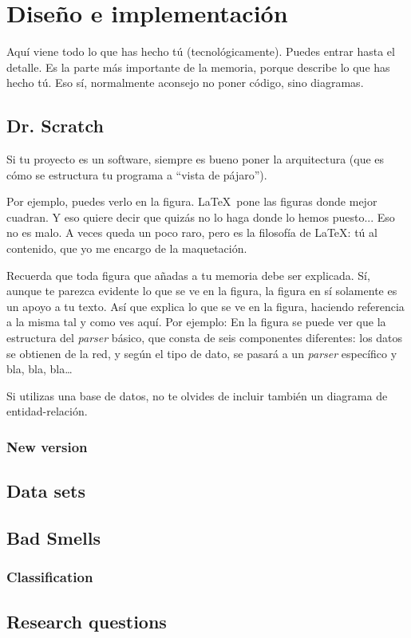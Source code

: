 

\cleardoublepage
\chapter{Diseño e implementación}

Aquí viene todo lo que has hecho tú (tecnológicamente). 
Puedes entrar hasta el detalle. 
Es la parte más importante de la memoria, porque describe lo que has hecho tú.
Eso sí, normalmente aconsejo no poner código, sino diagramas.

\section{Dr. Scratch} 
\label{sec:arquitectura}

Si tu proyecto es un software, siempre es bueno poner la arquitectura (que es cómo se estructura tu programa a ``vista de pájaro'').

Por ejemplo, puedes verlo en la figura.
\LaTeX \ pone las figuras donde mejor cuadran. 
Y eso quiere decir que quizás no lo haga donde lo hemos puesto...
Eso no es malo.
A veces queda un poco raro, pero es la filosofía de \LaTeX: tú al contenido, que yo me encargo de la maquetación.


Recuerda que toda figura que añadas a tu memoria debe ser explicada.
Sí, aunque te parezca evidente lo que se ve en la figura, la figura en sí solamente es un apoyo a tu texto.
Así que explica lo que se ve en la figura, haciendo referencia a la misma tal y como ves aquí.
Por ejemplo: En la figura se puede ver que la estructura del \emph{parser} básico, que consta de seis componentes diferentes: los datos se obtienen de la red, y según el tipo de dato, se pasará a un \emph{parser} específico y bla, bla, bla\ldots

Si utilizas una base de datos, no te olvides de incluir también un diagrama de entidad-relación.

\subsection{New version}
\label{subsec:newversion}

\section{Data sets}
\label{sec:datasets}

\section{Bad Smells}
\label{sec:badsmells}

\subsection{Classification}
\label{subsec:classification}

\section{Research questions}
\label{sec:researchquestions}